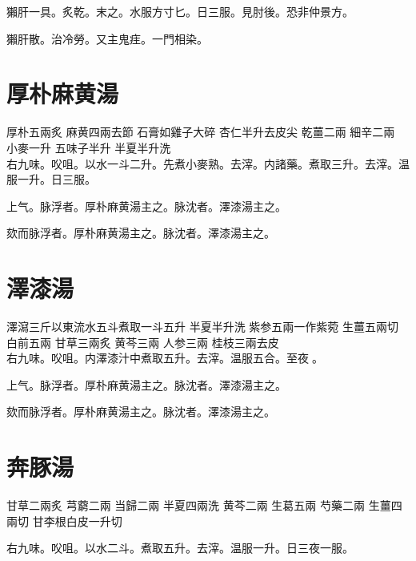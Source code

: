 獺肝一具。炙乾。末之。水服方寸匕。日三服。{\scriptsize 見肘後。恐非仲景方。}{\wuben}


獺肝散。治冷勞。又主鬼疰。一門相染。

\section{厚朴麻黄湯}

厚朴{\scriptsize 五兩炙} 麻黄{\scriptsize 四兩去節} 石膏{\scriptsize 如雞子大碎} 杏仁{\scriptsize 半升去皮尖} 乾薑{\scriptsize 二兩} 細辛{\scriptsize 二兩} 小麥{\scriptsize 一升} 五味子{\scriptsize 半升} 半夏{\scriptsize 半升洗}\\
右九味。㕮咀。以水一斗二升。先煮小麥熟。去滓。内諸藥。煮取三升。去滓。温服一升。日三服。

上气。脉浮者。厚朴麻黄湯主之。脉沈者。澤漆湯主之。{\wuben}

欬而脉浮者。厚朴麻黄湯主之。脉沈者。澤漆湯主之。{\dengben}

\section{澤漆湯}

澤瀉{\scriptsize 三斤以東流水五斗煮取一斗五升} 半夏{\scriptsize 半升洗} 紫参{\scriptsize 五兩一作紫菀} 生薑{\scriptsize 五兩切} 白前{\scriptsize 五兩} 甘草{\scriptsize 三兩炙} 黄芩{\scriptsize 三兩} 人参{\scriptsize 三兩} 桂枝{\scriptsize 三兩去皮}\\
右九味。㕮咀。内澤漆汁中煮取五升。去滓。温服五合。至夜{\sungtpii 𥁞}。

上气。脉浮者。厚朴麻黄湯主之。脉沈者。澤漆湯主之。{\wuben}

欬而脉浮者。厚朴麻黄湯主之。脉沈者。澤漆湯主之。{\dengben}

\section{奔豚湯}

甘草{\scriptsize 二兩{\khaaitp 炙}} 芎藭{\scriptsize 二兩} 当歸{\scriptsize 二兩} 半夏{\scriptsize 四兩{\khaaitp 洗}} 黄芩{\scriptsize 二兩} 生葛{\scriptsize 五兩} 芍藥{\scriptsize 二兩} 生薑{\scriptsize 四兩{\khaaitp 切}} 甘李根白皮{\scriptsize 一升{\khaaitp 切}}

右九味。{\khaaitp 㕮咀。}以水二斗。煮取五升。{\khaaitp 去滓。}温服一升。日三夜一服。

